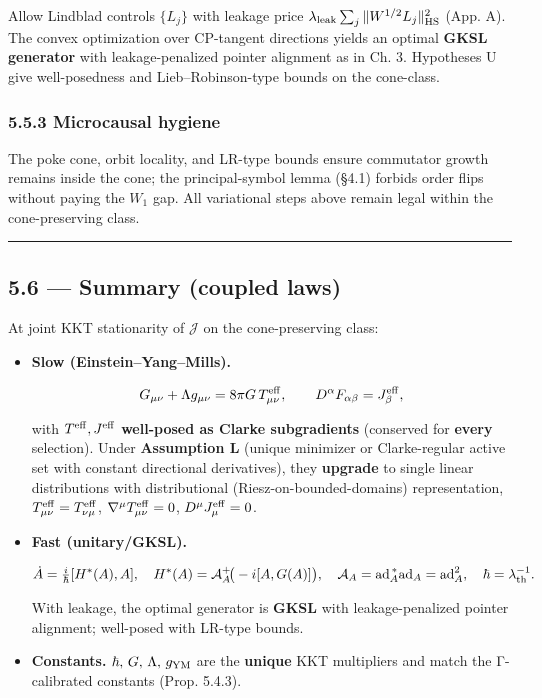 \documentclass[
]{article}
\numberwithin{equation}{section}
\begin{document}
Allow Lindblad controls \(\{L_j\}\) with leakage price
\(\lambda_{\rm leak}\sum_j\|W^{1/2}L_j\|_{\rm HS}^2\) (App. A). The
convex optimization over CP-tangent directions yields an optimal
\textbf{GKSL generator} with leakage-penalized pointer alignment as in
Ch. 3. Hypotheses U give well-posedness and Lieb--Robinson-type bounds
on the cone-class.

\hypertarget{microcausal-hygiene}{%
\subsubsection{5.5.3 Microcausal hygiene}\label{microcausal-hygiene}}

The poke cone, orbit locality, and LR-type bounds ensure commutator
growth remains inside the cone; the principal-symbol lemma (§4.1)
forbids order flips without paying the \(W_1\) gap. All variational
steps above remain legal within the cone-preserving class.

\begin{center}\rule{0.5\linewidth}{0.5pt}\end{center}

\hypertarget{summary-coupled-laws}{%
\subsection{5.6 --- Summary (coupled laws)}\label{summary-coupled-laws}}

At joint KKT stationarity of \(\mathcal J\) on the cone-preserving
class:

\begin{itemize}
\item
  \textbf{Slow (Einstein--Yang--Mills).}

  \[
  G_{\mu\nu}+\Lambda g_{\mu\nu}=8\pi G\,T^{\rm eff}_{\mu\nu},\qquad
  D^\alpha F_{\alpha\beta}=J^{\rm eff}_\beta,
  \]

  with \(T^{\rm eff},J^{\rm eff}\) \textbf{well-posed as Clarke
  subgradients} (conserved for \textbf{every} selection). Under
  \textbf{Assumption L} (unique minimizer or Clarke-regular active set
  with constant directional derivatives), they \textbf{upgrade} to
  single linear distributions with distributional
  (Riesz-on-bounded-domains) representation,
  \(T^{\rm eff}_{\mu\nu}=T^{\rm eff}_{\nu\mu}\),
  \(\nabla^\mu T^{\rm eff}_{\mu\nu}=0\), \(D^\mu J^{\rm eff}_\mu=0\).
\item
  \textbf{Fast (unitary/GKSL).}

  \[
  \dot A=\tfrac{i}{\hbar}[H^*(A),A],\quad
  H^*(A)=\mathcal A_A^{+}\!\big(-i[A,G(A)]\big),\quad
  \mathcal A_A=\mathrm{ad}_A^{\,*}\mathrm{ad}_A=\mathrm{ad}_A^2,\quad
  \hbar=\lambda_{\rm th}^{-1}.
  \]

  With leakage, the optimal generator is \textbf{GKSL} with
  leakage-penalized pointer alignment; well-posed with LR-type bounds.
\item
  \textbf{Constants.} \(\hbar,\,G,\,\Lambda,\,g_{\rm YM}\) are the
  \textbf{unique} KKT multipliers and match the Γ-calibrated constants
  (Prop. 5.4.3).
\end{itemize}
\end{document}
